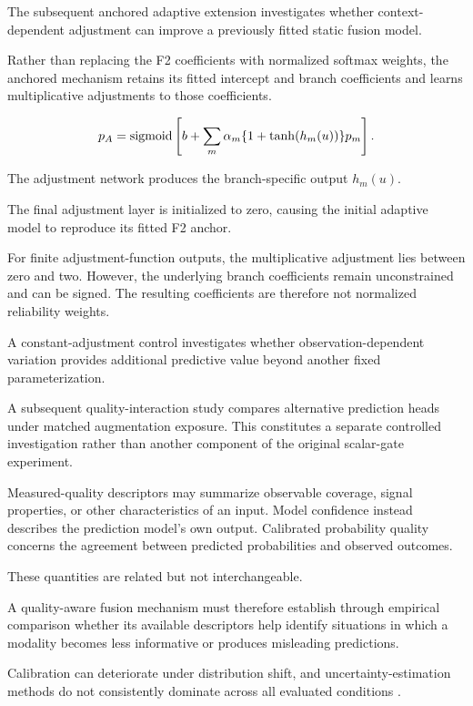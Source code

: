 The subsequent anchored adaptive extension investigates whether context-dependent adjustment can improve a previously fitted static fusion model.

Rather than replacing the F2 coefficients with normalized softmax weights, the anchored mechanism retains its fitted intercept and branch coefficients and learns multiplicative adjustments to those coefficients.

\begin{equation}
 p_A=\operatorname{sigmoid}\left[b+\sum_m\alpha_m\{1+\tanh(h_m(u))\}p_m\right].
 \label{eq:anchored}
\end{equation}

The adjustment network produces the branch-specific output \(h_m(u)\).

The final adjustment layer is initialized to zero, causing the initial adaptive model to reproduce its fitted F2 anchor.

For finite adjustment-function outputs, the multiplicative adjustment lies between zero and two. However, the underlying branch coefficients remain unconstrained and can be signed. The resulting coefficients are therefore not normalized reliability weights.

A constant-adjustment control investigates whether observation-dependent variation provides additional predictive value beyond another fixed parameterization.

A subsequent quality-interaction study compares alternative prediction heads under matched augmentation exposure. This constitutes a separate controlled investigation rather than another component of the original scalar-gate experiment.

Measured-quality descriptors may summarize observable coverage, signal properties, or other characteristics of an input. Model confidence instead describes the prediction model’s own output. Calibrated probability quality concerns the agreement between predicted probabilities and observed outcomes.

These quantities are related but not interchangeable.

A quality-aware fusion mechanism must therefore establish through empirical comparison whether its available descriptors help identify situations in which a modality becomes less informative or produces misleading predictions.

Calibration can deteriorate under distribution shift, and uncertainty-estimation methods do not consistently dominate across all evaluated conditions \parencite{P008}.

